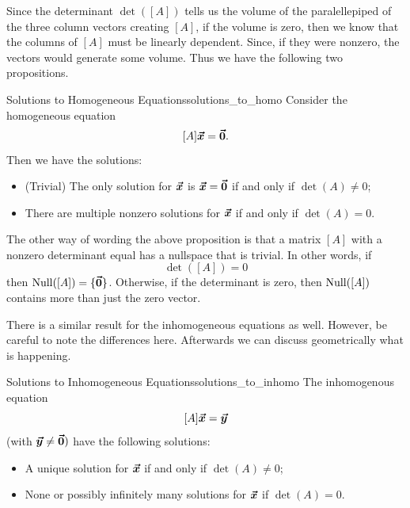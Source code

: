     Since the determinant $\det([A])$ tells us the volume of the paralellepiped of the three column vectors creating $[A]$, if the volume is zero, then we know that the columns of $[A]$ must be linearly dependent. Since, if they were nonzero, the vectors would generate some volume.  Thus we have the following two propositions.
    
    \begin{prop}{Solutions to Homogeneous Equations}{solutions_to_homo}
        Consider the homogeneous equation
        \[
        [A]\boldsymbol{\boldsymbol{\vec{x}}} = \boldsymbol{\vec{0}}.
        \]
        Then we have the solutions:
        \begin{itemize}
            \item (Trivial) The only solution for $\boldsymbol{\boldsymbol{\vec{x}}}$ is $\boldsymbol{\boldsymbol{\vec{x}}}=\boldsymbol{\vec{0}}$ if and only if $\det(A)\neq 0$;
            \item There are multiple nonzero solutions for $\boldsymbol{\boldsymbol{\vec{x}}}$ if and only if $\det(A)= 0$.
        \end{itemize}
        \end{prop}
        
        The other way of wording the above proposition is that a matrix $[A]$ with a nonzero determinant equal has a nullspace that is trivial. In other words, if 
        \[
        \det([A])= 0
        \]
        then $\mathrm{Null}([A])=\{\boldsymbol{\vec{0}}\}$.  Otherwise, if the determinant is zero, then $\mathrm{Null}([A])$ contains more than just the zero vector. 
        
        There is a similar result for the inhomogeneous equations as well.  However, be careful to note the differences here. Afterwards we can discuss geometrically what is happening.
        
        \begin{prop}{Solutions to Inhomogeneous Equations}{solutions_to_inhomo}
        The inhomogenous equation
        \[
        [A]\boldsymbol{\boldsymbol{\vec{x}}} = \boldsymbol{\boldsymbol{\vec{y}}}
        \]
        (with $\boldsymbol{\boldsymbol{\vec{y}}}\neq \boldsymbol{\vec{0}})$ have the following solutions:
        \begin{itemize}
            \item A unique solution for $\boldsymbol{\boldsymbol{\vec{x}}}$ if and only if $\det(A)\neq 0$;
            \item None or possibly infinitely many solutions for $\boldsymbol{\boldsymbol{\vec{x}}}$ if $\det(A)=0$.
        \end{itemize}
        \end{prop}
        
